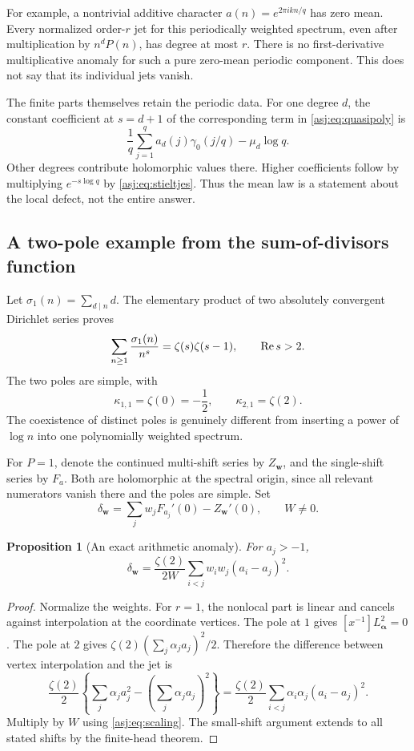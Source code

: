 \documentclass[11pt]{article}
\numberwithin{equation}{section}
\newtheorem{proposition}[theorem]{Proposition}
\theoremstyle{definition}\newtheorem{definition}[theorem]{Definition}
\theoremstyle{remark}\newtheorem{remark}[theorem]{Remark}\newtheorem{example}[theorem]{Example}
\begin{document}
For example, a nontrivial additive character $a(n)=e^{2\pi i kn/q}$ has
zero mean. Every normalized order-$r$ jet for this periodically weighted
spectrum, even after multiplication by $n^dP(n)$, has degree at most $r$.
There is no first-derivative multiplicative anomaly for such a pure
zero-mean periodic component. This does not say that its individual jets
vanish.

The finite parts themselves retain the periodic data. For one degree $d$,
the constant coefficient at $s=d+1$ of the corresponding term in
\eqref{asj:eq:quasipoly} is
\[
 \frac1q\sum_{j=1}^q a_d(j)\gamma_0(j/q)-\mu_d\log q.
\]
Other degrees contribute holomorphic values there. Higher coefficients
follow by multiplying $e^{-s\log q}$ by \eqref{asj:eq:stieltjes}. Thus the
mean law is a statement about the local defect, not the entire answer.

\subsection{A two-pole example from the sum-of-divisors function}
Let $\sigma_1(n)=\sum_{d\mid n}d$. The elementary product of two
absolutely convergent Dirichlet series proves
\begin{equation}\label{asj:eq:sigma1}
 \sum_{n\ge1}\frac{\sigma_1(n)}{n^s}=\zeta(s)\zeta(s-1),
 \qquad \operatorname{Re} s>2.
\end{equation}
The two poles are simple, with
\[
 \kappa_{1,1}=\zeta(0)=-\frac12,
 \qquad \kappa_{2,1}=\zeta(2).
\]
The coexistence of distinct poles is genuinely different from inserting
a power of $\log n$ into one polynomially weighted spectrum.

For $P=1$, denote the continued multi-shift series by $Z_{\boldsymbol w}$,
and the single-shift series by $F_a$. Both are holomorphic at the spectral
origin, since all relevant numerators vanish there and the poles are simple.
Set
\[
 \delta_{\boldsymbol w}=
        \sum_j w_jF_{a_j}'(0)-Z_{\boldsymbol w}'(0),\qquad W\ne0.
\]
\begin{proposition}[An exact arithmetic anomaly]\label{asj:thm:sigma}
For $a_j>-1$,
\begin{equation}\label{asj:eq:sigma-anomaly}
 \boxed{\displaystyle
 \delta_{\boldsymbol w}
      =\frac{\zeta(2)}{2W}
                 \sum_{i<j}w_iw_j(a_i-a_j)^2.}
\end{equation}
\end{proposition}
\begin{proof}
Normalize the weights. For $r=1$, the nonlocal part is linear and cancels
against interpolation at the coordinate vertices. The pole at $1$ gives
$[x^{-1}]L_{\boldsymbol\alpha}^2=0$. The pole at $2$ gives
$\zeta(2)(\sum_j\alpha_ja_j)^2/2$. Therefore the difference between
vertex interpolation and the jet is
\[
 \frac{\zeta(2)}2\left\{
       \sum_j\alpha_ja_j^2-\left(\sum_j\alpha_ja_j\right)^2\right\}
   =\frac{\zeta(2)}2\sum_{i<j}\alpha_i\alpha_j(a_i-a_j)^2.
\]
Multiply by $W$ using \eqref{asj:eq:scaling}. The small-shift argument extends
to all stated shifts by the finite-head theorem.
\end{proof}
\end{document}
